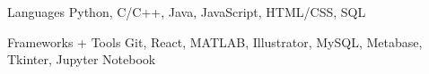 \documentclass[12pt, letterpaper]{awesome-cv}
\begin{document}
\begin{cvskills}
  \cvskill
    {Languages} %
    {Python, C/C++, Java, JavaScript, HTML/CSS, SQL} %

  \cvskill
    {Frameworks + Tools} %
    {Git, React, MATLAB, Illustrator, MySQL, Metabase, Tkinter, Jupyter Notebook} %
  
    
\end{cvskills}

\end{document}
